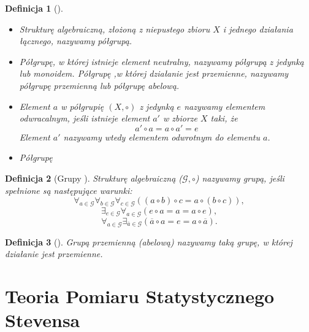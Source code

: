 \documentclass[12pt,a4paper]{report}
\newtheorem{definition}{Definicja}[chapter]
\begin{document}
\begin{definition}[{\citep[Sec 4.2 Def. 4.9]{jedrzejewski2011algebra}}]
\begin{itemize}
\item
Strukturę algebraiczną, złożoną z niepustego zbioru $X$ i jednego działania łącznego, nazywamy półgrupą.
\item
Półgrupę, w której istnieje element neutralny, nazywamy półgrupą z jedynką lub monoidem. Półgrupę ,w której działanie jest przemienne, nazywamy półgrupę przemienną lub półgrupę abelową. 
\item
Element $a$ w półgrupię $(X,\circ)$ z jedynką $e$ nazywamy elementem odwracalnym, jeśli istnieje element $a'$ w zbiorze $X$ taki, że
\begin{equation*}
a'\circ a=a\circ a'=e
\end{equation*}
Element $a'$ nazywamy wtedy elementem odwrotnym do elementu $a$.
\item
Półgrupę
\end{itemize}
\end{definition}
\begin{definition}[Grupy {\citep[Sec 4.3 Def. 4.10]{jedrzejewski2011algebra}}]
Strukturę algebraiczną ($\mathcal{G},\circ$) nazywamy grupą, jeśli spełnione są następujące warunki:
\begin{equation*}
\forall_{a\in \mathcal{G}} \forall_{b\in \mathcal{G}} \forall_{c\in \mathcal{G}} ((a\circ b)\circ c=a\circ (b\circ c)),
\end{equation*}
\begin{equation*}
\exists_{e\in \mathcal{G}} \forall_{a\in \mathcal{G}}(e\circ a=a=a\circ e),
\end{equation*}
\begin{equation*}
\forall_{a \in \mathcal{G}} \exists_{\overline{a}\in\mathcal{G}}(\overline{a}\circ a=e=a\circ\overline{a}).
\end{equation*}
\end{definition}
\begin{definition}[{\citep[Sec 4.3 Def. 4.12]{jedrzejewski2011algebra}}]
Grupą przemienną (abelową) nazywamy taką grupę, w której działanie jest przemienne.
\end{definition}



\chapter{Teoria Pomiaru Statystycznego Stevensa}
\end{document}
